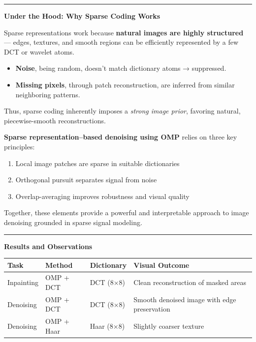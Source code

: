\documentclass[11pt]{article}
\providecommand{\tightlist}{%
      \setlength{\itemsep}{0pt}\setlength{\parskip}{0pt}}
\begin{document}
\begin{center}\rule{0.5\linewidth}{0.5pt}\end{center}

\textbf{Under the Hood: Why Sparse Coding Works}

Sparse representations work because \textbf{natural images are highly
structured} --- edges, textures, and smooth regions can be efficiently
represented by a few DCT or wavelet atoms.

\begin{itemize}
\tightlist
\item
  \textbf{Noise}, being random, doesn't match dictionary atoms →
  suppressed.
\item
  \textbf{Missing pixels}, through patch reconstruction, are inferred
  from similar neighboring patterns.
\end{itemize}

Thus, sparse coding inherently imposes a \emph{strong image prior},
favoring natural, piecewise-smooth reconstructions.

\textbf{Sparse representation--based denoising using OMP} relies on
three key principles:

\begin{enumerate}
\def\labelenumi{\arabic{enumi}.}
\tightlist
\item
  Local image patches are sparse in suitable dictionaries
\item
  Orthogonal pursuit separates signal from noise
\item
  Overlap-averaging improves robustness and visual quality
\end{enumerate}

Together, these elements provide a powerful and interpretable approach
to image denoising grounded in sparse signal modeling.

\begin{center}\rule{0.5\linewidth}{0.5pt}\end{center}

\textbf{Results and Observations}

\begin{longtable}[]{@{}llll@{}}
\toprule
Task & Method & Dictionary & Visual Outcome \\
\midrule
\endhead
Inpainting & OMP + DCT & DCT (8×8) & Clean reconstruction of masked
areas \\
Denoising & OMP + DCT & DCT (8×8) & Smooth denoised image with edge
preservation \\
Denoising & OMP + Haar & Haar (8×8) & Slightly coarser texture \\
\bottomrule
\end{longtable}
\end{document}

